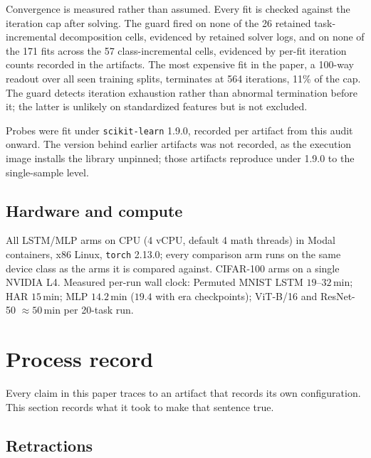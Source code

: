 Convergence is measured rather than assumed. Every fit is checked against the
iteration cap after solving. The guard fired on none of the 26 retained
task-incremental decomposition cells, evidenced by retained solver logs, and on
none of the 171 fits across the 57 class-incremental cells, evidenced by
per-fit iteration counts recorded in the artifacts. The most expensive fit in
the paper, a 100-way readout over all seen training splits, terminates at 564
iterations, 11\% of the cap. The guard detects iteration exhaustion rather than
abnormal termination before it; the latter is unlikely on standardized features
but is not excluded.

Probes were fit under \texttt{scikit-learn} 1.9.0, recorded per artifact from
this audit onward. The version behind earlier artifacts was not recorded, as
the execution image installs the library unpinned; those artifacts reproduce
under 1.9.0 to the single-sample level.

\subsection{Hardware and compute}

All LSTM/MLP arms on CPU (4 vCPU, default 4 math threads) in Modal containers,
x86 Linux, \texttt{torch} 2.13.0; every comparison arm runs on the same device
class as the arms it is compared against. CIFAR-100 arms on a single NVIDIA L4.
Measured per-run wall clock: Permuted MNIST LSTM $19$--$32$\,min; HAR $15$\,min;
MLP $14.2$\,min ($19.4$ with era checkpoints); ViT-B/16 and ResNet-50
$\approx 50$\,min per 20-task run. 

\section{Process record}
\label{app:process}

Every claim in this paper traces to an artifact that records its own
configuration. This section records what it took to make that sentence true.

\subsection{Retractions}

